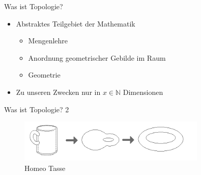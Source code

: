 \documentclass{beamer}
\newcommand\N{\ensuremath{\mathbb{N}}}
\begin{document}
\begin{frame}{Was ist Topologie?}
    \begin{itemize}
        \item Abstraktes Teilgebiet der Mathematik
            \begin{itemize}
                \item Mengenlehre
                \item Anordnung geometrischer Gebilde im Raum
                \item Geometrie 
            \end{itemize}
        \item Zu unseren Zwecken nur in $x\in \N$ Dimensionen
    \end{itemize}
\end{frame}

\begin{frame}{Was ist Topologie? 2}
\begin{figure}[htpb]
    \centering
    \includegraphics[width=0.8\textwidth]{figures/Homeo_tasse.png}
    \caption{Homeo Tasse}
    \label{fig:Homeo Tasse}
\end{figure}
\end{frame}

    
\end{document}
